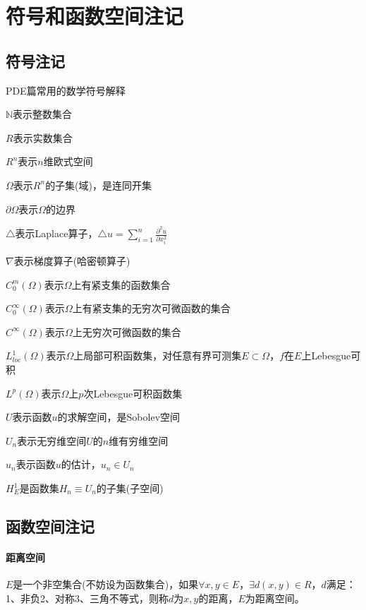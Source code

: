 \section{符号和函数空间注记}
    \subsection{符号注记}
        PDE篇常用的数学符号解释
        \par
        $\mathbb{N}$表示整数集合
        \par
        $R$表示实数集合
        \par
        $R^n$表示$n$维欧式空间
        \par
        $\Omega$表示$R^n$的子集(域)，是连同开集
        \par
        $\partial \Omega$表示$\Omega$的边界
        \par
        $\triangle$表示Laplace算子，$\triangle u = \sum_{i = 1}^n\frac{\partial^2 u}{\partial x_i^2}$
        \par
        $\nabla$表示梯度算子(哈密顿算子)
        \par
        $C_0^m(\Omega)$表示$\Omega$上有紧支集的函数集合
        \par
        $C_0^{\infty}(\Omega)$表示$\Omega$上有紧支集的无穷次可微函数的集合
        \par
        $C^{\infty}(\Omega)$表示$\Omega$上无穷次可微函数的集合
        \par
        $L_{loc}^1 (\Omega)$表示$\Omega$上局部可积函数集，对任意有界可测集$E \subset \Omega$，$f$在$E$上Lebesgue可积
        \par
        $L^p(\Omega)$表示$\Omega$上$p$次Lebesgue可积函数集
        \par
        $U$表示函数$u$的求解空间，是Sobolev空间
        \par
        $U_n$表示无穷维空间$U$的$n$维有穷维空间
        \par
        $u_n$表示函数$u$的估计，$u_n \in U_n$
        \par
        $H_E^1$是函数集$H_n \equiv U_n$的子集(子空间)
    \subsection{函数空间注记}
        \paragraph{距离空间}
        $E$是一个非空集合(不妨设为函数集合)，如果$\forall x,y \in E$，$\exists d(x,y) \in R$，$d$满足：1、非负2、对称3、三角不等式，则称$d$为$x,y$的距离，$E$为距离空间。
